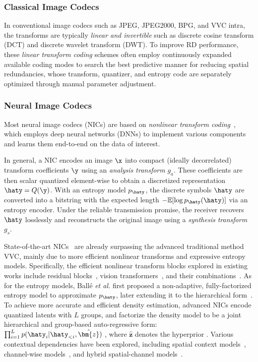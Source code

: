     \subsubsection{Classical Image Codecs}

    In conventional image codecs such as JPEG, JPEG2000, BPG\cite{BPG}, and VVC intra\cite{VVC_intra}, the transforms are typically \emph{linear and invertible} such as discrete cosine transform (DCT) and discrete wavelet transform (DWT). To improve RD performance, these \emph{linear transform coding} schemes often employ continuously expanded available coding modes to search the best predictive manner for reducing spatial redundancies, whose transform, quantizer, and entropy code are separately optimized through manual parameter adjustment.

    \subsubsection{Neural Image Codecs}
    Most neural image codecs (NICs) are based on \emph{nonlinear transform coding}~\cite{balle2020nonlinear}, which employs deep neural networks (DNNs) to implement various components and learns them end-to-end on the data of interest.
    
	In general, a NIC encodes an image $\x$ into compact (ideally decorrelated) transform coefficients $\y$ using an \emph{analysis transform} $g_a$. These coefficients are then scalar quantized element-wise to obtain a discretized representation $\haty = Q(\y)$. With an entropy model $p_{\haty}$, the discrete symbols $\haty$ are converted into a bitstring with the expected length $-\mathbb{E}[\log p_{\haty}(\haty)]$ via an entropy encoder. 
    Under the reliable transmission promise, the receiver recovers $\haty$ losslessly and reconstructs the original image using a \emph{synthesis transform} $g_s$.	
    
    State-of-the-art NICs~\cite{cheng2020learned, he2022elic, zou2022devil, lu2022high} are already surpassing the advanced traditional method VVC, mainly due to more efficient nonlinear transforms and expressive entropy models. 
    Specifically, the efficient nonlinear transform blocks explored in existing works include residual blocks~\cite{cheng2020learned, he2022elic}, vision transformers~\cite{zou2022devil}, and their combinations~\cite{lu2022high, liu2023learned, jiang2023mlic}.
    As for the entropy models, Ballé \emph{et al.} \cite{balle2016} first proposed a non-adaptive, fully-factorized entropy model to approximate $p_{\haty}$, later extending it to the hierarchical form~\cite{balle2018}.
    To achieve more accurate and efficient density estimation, advanced NICs encode quantized latents with $L$ groups, and factorize the density model to be a joint hierarchical and group-based auto-regressive form: $\prod_{i=1}^{L} p(\haty_{i} | \haty_{<i}, \hat{\bm{z}})$ \cite{minnen2018, lu2022high, he2022elic}, where $\hat{\bm{z}}$ denotes the hyperprior \cite{balle2018}. 
    Various contextual dependencies have been explored, including spatial context models~\cite{minnen2018, he2021checkerboard, mentzer2023m2t}, channel-wise models~\cite{minnen2020channel}, and hybrid spatial-channel models~\cite{he2022elic, lu2022high}.
	
